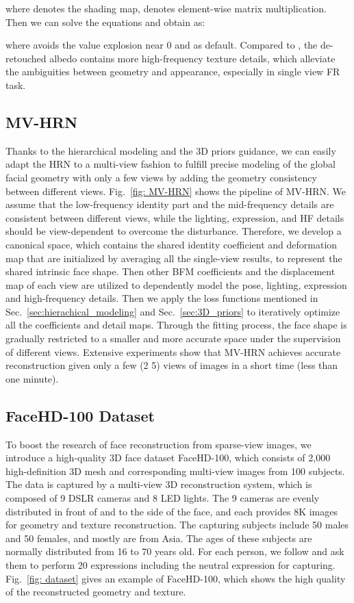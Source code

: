 \documentclass[10pt,twocolumn,letterpaper]{article}
\begin{document}
where  denotes the shading map,  denotes element-wise matrix multiplication. Then we can solve the equations and obtain  as:


where  avoids the value explosion near 0 and  as default. Compared to , the de-retouched albedo  contains more high-frequency texture details, which alleviate the ambiguities between geometry and appearance, especially in single view FR task.

\subsection{MV-HRN} \label{sec:MV-HRN}

Thanks to the hierarchical modeling and the 3D priors guidance, we can easily adapt the HRN to a multi-view fashion to fulfill precise modeling of the global facial geometry with only a few views by adding the geometry consistency between different views. Fig.~\ref{fig: MV-HRN} shows the pipeline of MV-HRN. We assume that the low-frequency identity part and the mid-frequency details are consistent between different views, while the lighting, expression, and HF details should be view-dependent to overcome the disturbance. Therefore, we develop a canonical space, which contains the shared identity coefficient and deformation map that are initialized by averaging all the single-view results, to represent the shared intrinsic face shape. Then other BFM coefficients and the displacement map of each view are utilized to dependently model the pose, lighting, expression and high-frequency details. Then we apply the loss functions mentioned in Sec.~\ref{sec:hierachical_modeling} and Sec.~\ref{sec:3D_priors} to iteratively optimize all the coefficients and detail maps. Through the fitting process, the face shape is gradually restricted to a smaller and more accurate space under the supervision of different views. Extensive experiments show that MV-HRN achieves accurate reconstruction given only a few (2  5) views of images in a short time (less than one minute).

\subsection{FaceHD-100 Dataset} \label{sec:dataset}
To boost the research of face reconstruction from sparse-view images, we introduce a high-quality 3D face dataset FaceHD-100, which consists of 2,000 high-definition 3D mesh and corresponding multi-view images from 100 subjects. The data is captured by a multi-view 3D reconstruction system, which is composed of 9 DSLR cameras and 8 LED lights. The 9 cameras are evenly distributed in front of and to the side of the face, and each provides 8K images for geometry and texture reconstruction. The capturing subjects include 50 males and 50 females, and mostly are from Asia. The ages of these subjects are normally distributed from 16 to 70 years old. For each person, we follow\cite{triplegangers} and ask them to perform 20 expressions including the neutral expression for capturing. Fig.~\ref{fig: dataset} gives an example of FaceHD-100, which shows the high quality of the reconstructed geometry and texture.
\end{document}
